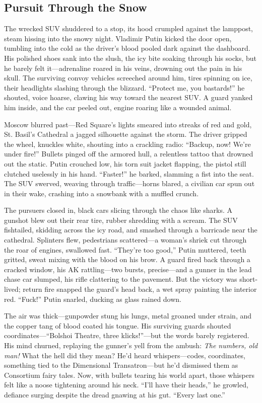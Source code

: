 \documentclass[12pt]{book}
\begin{document}
\subsection{Pursuit Through the Snow}

The wrecked SUV shuddered to a stop, its hood crumpled against the lamppost, steam hissing into the snowy night. Vladimir Putin kicked the door open, tumbling into the cold as the driver’s blood pooled dark against the dashboard. His polished shoes sank into the slush, the icy bite soaking through his socks, but he barely felt it—adrenaline roared in his veins, drowning out the pain in his skull. The surviving convoy vehicles screeched around him, tires spinning on ice, their headlights slashing through the blizzard. “Protect me, you bastards!” he shouted, voice hoarse, clawing his way toward the nearest SUV. A guard yanked him inside, and the car peeled out, engine roaring like a wounded animal.

Moscow blurred past—Red Square’s lights smeared into streaks of red and gold, St. Basil’s Cathedral a jagged silhouette against the storm. The driver gripped the wheel, knuckles white, shouting into a crackling radio: “Backup, now! We’re under fire!” Bullets pinged off the armored hull, a relentless tattoo that drowned out the static. Putin crouched low, his torn suit jacket flapping, the pistol still clutched uselessly in his hand. “Faster!” he barked, slamming a fist into the seat. The SUV swerved, weaving through traffic—horns blared, a civilian car spun out in their wake, crashing into a snowbank with a muffled crunch.

The pursuers closed in, black cars slicing through the chaos like sharks. A gunshot blew out their rear tire, rubber shredding with a scream. The SUV fishtailed, skidding across the icy road, and smashed through a barricade near the cathedral. Splinters flew, pedestrians scattered—a woman’s shriek cut through the roar of engines, swallowed fast. “They’re too good,” Putin muttered, teeth gritted, sweat mixing with the blood on his brow. A guard fired back through a cracked window, his AK rattling—two bursts, precise—and a gunner in the lead chase car slumped, his rifle clattering to the pavement. But the victory was short-lived; return fire snapped the guard’s head back, a wet spray painting the interior red. “Fuck!” Putin snarled, ducking as glass rained down.

The air was thick—gunpowder stung his lungs, metal groaned under strain, and the copper tang of blood coated his tongue. His surviving guards shouted coordinates—“Bolshoi Theatre, three klicks!”—but the words barely registered. His mind churned, replaying the gunner’s yell from the ambush: \textit{The numbers, old man!} What the hell did they mean? He’d heard whispers—codes, coordinates, something tied to the Dimensional Transatron—but he’d dismissed them as Consortium fairy tales. Now, with bullets tearing his world apart, those whispers felt like a noose tightening around his neck. “I’ll have their heads,” he growled, defiance surging despite the dread gnawing at his gut. “Every last one.”
\end{document}
